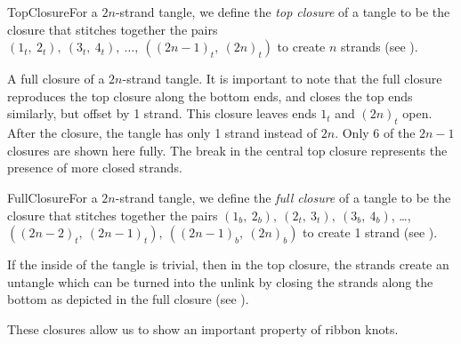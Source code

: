 \begin{paper}
\begin{paperdef}{TopClosure}{For a $2n$-strand tangle, we define the
\textit{top closure} of a tangle to be the closure that stitches together the
pairs $(1_t,~2_t),~(3_t,~4_t),~\dots,~((2n-1)_t,~(2n)_t)$ to create
$n$ strands (see \figTop).}\end{paperdef}

{A full closure of a $2n$-strand tangle.
It is important to note that the full closure reproduces the top closure along
the bottom ends, and closes the top ends similarly, but offset by 1 strand.
This closure leaves ends $1_t$ and $(2n)_t$ open.
After the closure, the tangle has only 1 strand instead of $2n$.
Only 6 of the $2n-1$ closures are shown here fully.
The break in the central top closure represents the presence of more closed
strands.}

\begin{paperdef}{FullClosure}{For a $2n$-strand tangle, we define the
\textit{full closure} of a tangle to be the closure that stitches together the
pairs $(1_b,~2_b),~(2_t,~3_t),~(3_b,~4_b)$, \dots,
$((2n-2)_t,~(2n-1)_t),~((2n-1)_b,~(2n)_b)$ to create 1 strand (see
\figFull).}\end{paperdef}

If the inside of the tangle is trivial, then in the top closure, the strands
create an untangle which can be turned into the unlink by closing the strands
along the bottom as depicted in the full closure (see \figFull).

These closures allow us to show an important property of ribbon knots.


\end{paper}
